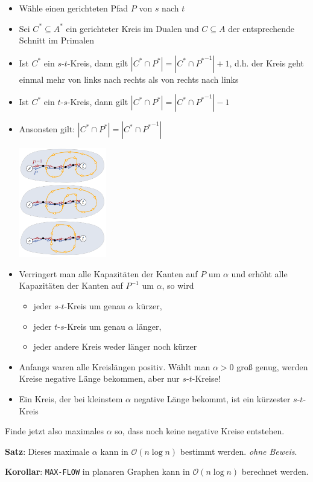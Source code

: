 \begin{itemize}
	\item Wähle einen gerichteten Pfad $P$ von $s$ nach $t$
	\item Sei $C^*\subseteq A^*$ ein gerichteter Kreis im Dualen und $C\subseteq A$ der entsprechende Schnitt im Primalen
	\item Ist $C^*$ ein $s$-$t$-Kreis, dann gilt $|C^*\cap P^*|=|C^*\cap {P^*}^{-1}|+1$, d.h. der Kreis geht einmal mehr von links nach rechts als von rechts nach links
	\item Ist $C^*$ ein $t$-$s$-Kreis, dann gilt $|C^*\cap P^*|=|C^*\cap {P^*}^{-1}|-1$
	\item Ansonsten gilt: $|C^*\cap P^*|=|C^*\cap {P^*}^{-1}|$
	\begin{center}
		\includegraphics[width=0.3\textwidth]{images/max-flow-4.png}
	\end{center}
	\item Verringert man alle Kapazitäten der Kanten auf $P$ um $\alpha$ und erhöht alle Kapazitäten der Kanten auf $P^{-1}$ um $\alpha$, so wird
	\begin{itemize}
		\item jeder $s$-$t$-Kreis um genau $\alpha$ kürzer,
		\item jeder $t$-$s$-Kreis um genau $\alpha$ länger,
		\item jeder andere Kreis weder länger noch kürzer
	\end{itemize}
	\item Anfangs waren alle Kreislängen positiv. Wählt man $\alpha>0$ groß genug, werden Kreise negative Länge bekommen, aber nur $s$-$t$-Kreise!
	\item Ein Kreis, der bei kleinstem $\alpha$ negative Länge bekommt, ist ein kürzester $s$-$t$-Kreis
\end{itemize}

Finde jetzt also maximales $\alpha$ so, dass noch keine negative Kreise entstehen.

\textbf{Satz}: Dieses maximale $\alpha$ kann in $\mathcal{O}(n\log n)$ bestimmt werden. \qquad \textit{ohne Beweis}.

\textbf{Korollar}: \texttt{MAX-FLOW} in planaren Graphen kann in $\mathcal{O}(n\log n)$ berechnet werden.
